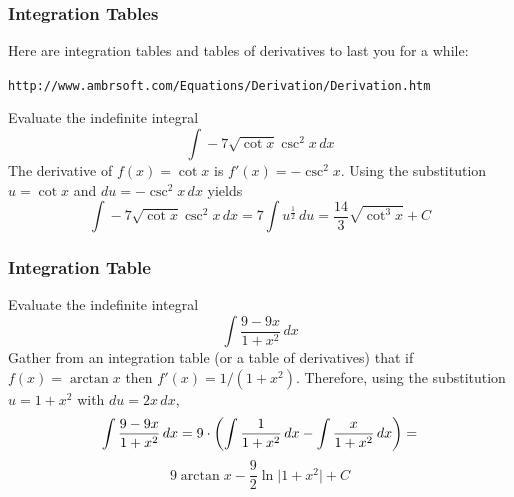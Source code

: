 \documentclass[xcolor=dvipsnames]{beamer}
\begin{document}

\begin{frame}
  \frametitle{Integration Tables}
  Here are integration tables and tables of derivatives to last you
  for a while:
\begin{alltt}
\small
http://www.ambrsoft.com/Equations/Derivation/Derivation.htm
\end{alltt}

 Evaluate the indefinite integral
\begin{equation}
  \label{eq:eewuquex}
  \int{}-7\sqrt{\cot{}x}\csc^{2}x\,dx
\end{equation}
The derivative of $f(x)=\cot{}x$ is $f'(x)=-\csc^{2}x$. Using the
substitution $u=\cot{}x$ and $du=-\csc^{2}x\,dx$ yields
\begin{equation}
  \label{eq:bahyathe}
  \int{}-7\sqrt{\cot{}x}\csc^{2}x\,dx=7\int{}u^{\frac{1}{2}}\,du=\frac{14}{3}\sqrt{\cot^{3}x}+C
\end{equation}
\end{frame}

\begin{frame}
  \frametitle{Integration Table}
   Evaluate the indefinite integral
  \begin{equation}
    \label{eq:xohphohh}
    \int{}\frac{9-9x}{1+x^{2}}\,dx
  \end{equation}
Gather from an integration table (or a table of derivatives) that if
$f(x)=\arctan{}x$ then $f'(x)=1/(1+x^{2})$. Therefore, using the
substitution $u=1+x^{2}$ with $du=2x\,dx$,
\begin{equation}
  \label{eq:mixausho}
  \int{}\frac{9-9x}{1+x^{2}}\,dx=9\cdot\left(\int\frac{1}{1+x^{2}}\,dx-\int\frac{x}{1+x^{2}}\,dx\right)=\notag
\end{equation}
\begin{equation}
  \label{eq:ohleseej}
  9\arctan{}x-\frac{9}{2}\ln\vert{}1+x^{2}\vert{}+C
\end{equation}
\end{frame}
\end{document}
